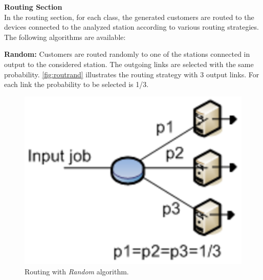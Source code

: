 \noindent \textbf{Routing Section}\\ In the routing section, for
each class, the generated customers are routed to the devices
connected to the analyzed station according to various routing
strategies. The following algorithms are available:
\begin{itemize*}
\item \textbf{Random:} Customers are routed randomly to one of the
stations connected in output to the considered station. The
outgoing links are selected with the same probability.
\autoref{fig:routrand} illustrates the routing strategy with 3 output
links. For each link the probability to be selected is 1/3.
\begin{figure}[htb]
    \begin{center}
        \includegraphics[scale=.5]{img/jsimg/8.7.eps}
    \end{center}
    \caption{Routing with \emph{Random} algorithm.}
    \label{fig:routrand}
\end{figure}


\end{itemize*}
